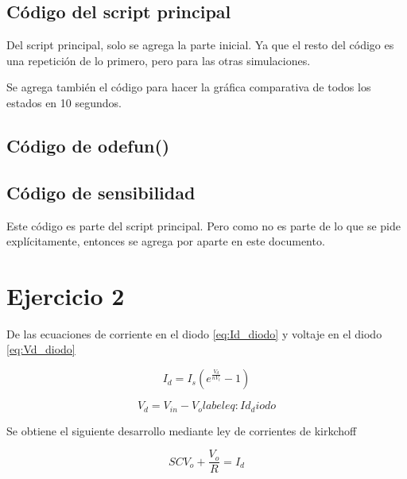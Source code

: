 \documentclass[12pt,letterpaper]{article}
\begin{document}
\subsection{Código del script principal}
 Del script principal, solo se agrega la parte inicial. Ya que el resto del código es una repetición de lo primero, pero para las otras simulaciones.
 
 
 Se agrega también el código para hacer la gráfica comparativa de todos los estados en 10 segundos.
  
 
\subsection{Código de odefun()}
 
\subsection{Código de sensibilidad}
 Este código es parte del script principal. Pero como no es parte de lo que se pide explícitamente, entonces se agrega por aparte en este documento.
  
 
  



\section{Ejercicio 2}

De las ecuaciones de corriente en el diodo \eqref{eq:Id_diodo} y voltaje en el diodo  \eqref{eq:Vd_diodo}

\begin{equation}
\label{eq:Id_diodo}
I_d=I_s(e^{\frac{V_d}{nV_t}}-1)
\end{equation}



\begin{equation}\label{eq:Vd_diodo}
V_d= V_{in}-V_o
label{eq:Id_diodo}
\end{equation}

Se obtiene el siguiente desarrollo mediante ley de corrientes de kirkchoff 

\begin{equation}
SCV_o + \frac{V_o}{R} = I_d
\end{equation}
\end{document}
